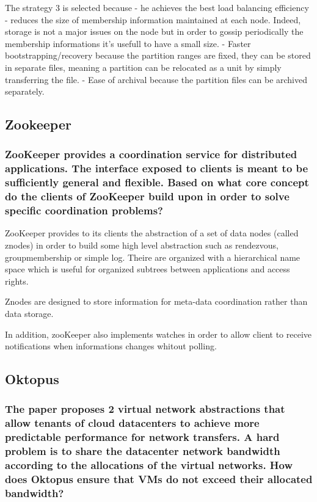 The strategy 3 is selected because
- he achieves the best load balancing efficiency 
- reduces the size of membership information maintained at each node.
Indeed, storage is not a major issues on the node but in order to gossip
periodically the membership informations it's usefull to have a small
size.
- Faster bootstrapping/recovery because the partition ranges are fixed,
they can be stored in separate files, meaning a partition can be
relocated as a unit by simply transferring the file.
- Ease of archival because  the partition files can be archived
separately.

\subsection{Zookeeper}

\subsubsection*{ZooKeeper provides a coordination service for distributed
applications. The interface exposed to clients is meant to be
sufficiently general and flexible. Based on what core concept do the
clients of ZooKeeper build upon in order to solve specific coordination
problems?}

ZooKeeper provides to its clients the abstraction of a set of data nodes
(called znodes) in order to build some high level abstraction such as
rendezvous, groupmembership or simple log. Theire are organized with a
hierarchical name space which is useful for organized subtrees between
applications and access rights.

Znodes are designed to store information for meta-data coordination
rather than data storage.

In addition, zooKeeper also implements watches in order to allow client
to receive notifications when informations changes whitout polling.


\subsection{Oktopus}

\subsubsection*{The paper proposes 2 virtual network abstractions that allow tenants of cloud datacenters to achieve more predictable performance for network transfers. A hard problem is to share the datacenter network bandwidth according to the allocations of the virtual networks. How does Oktopus ensure that VMs do not exceed their allocated bandwidth?}

